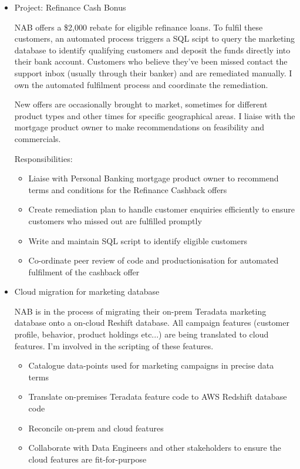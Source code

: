 \documentclass{article}
\begin{document}
\begin{itemize}
    \item Project: Refinance Cash Bonus

        NAB offers a \$2,000 rebate for eligible refinance loans. To fulfil these customers, an automated process triggers a SQL scipt to query the marketing database to identify qualifying customers and deposit the funds directly into their bank account. Customers who believe they've been missed contact the support inbox (usually through their banker) and are remediated manually. I own the automated fulfilment process and coordinate the remediation.

        New offers are occasionally brought to market, sometimes for different product types and other times for specific geographical areas. I liaise with the mortgage product owner to make recommendations on feasibility and commercials.

Responsibilities:

        \begin{itemize}
            \item Liaise with Personal Banking mortgage product owner to recommend terms and conditions for the Refinance Cashback offers
            \item Create remediation plan to handle customer enquiries efficiently to ensure customers who missed out are fulfilled promptly
            \item Write and maintain SQL script to identify eligible customers
            \item Co-ordinate peer review of code and productionisation for automated fulfilment of the cashback offer
        \end{itemize}
    \item Cloud migration for marketing database

        NAB is in the process of migrating their on-prem Teradata marketing database onto a on-cloud Reshift database. All campaign features (customer profile, behavior, product holdings etc...) are being translated to cloud features. I'm involved in the scripting of these features.

        \begin{itemize}
            \item Catalogue data-points used for marketing campaigns in precise data terms
            \item Translate on-premises Teradata feature code to AWS Redshift database code
            \item Reconcile on-prem and cloud features
            \item Collaborate with Data Engineers and other stakeholders to ensure the cloud features are fit-for-purpose
        \end{itemize}
\end{itemize}
\end{document}
